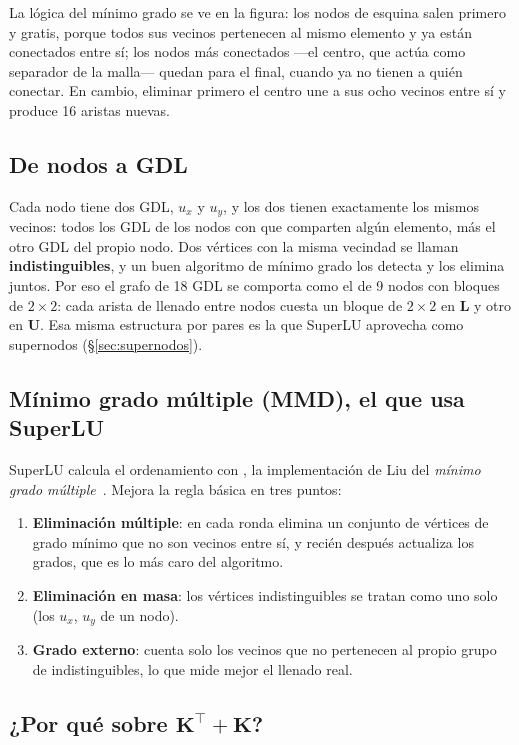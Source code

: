 \documentclass[11pt,a4paper]{article}
\newcommand{\cod}[1]{\texttt{\detokenize{#1}}}
\begin{document}
La lógica del mínimo grado se ve en la figura: los nodos de esquina salen primero y gratis, porque todos sus vecinos pertenecen al mismo elemento y ya están conectados entre sí; los nodos más conectados ---el centro, que actúa como separador de la malla--- quedan para el final, cuando ya no tienen a quién conectar. En cambio, eliminar primero el centro une a sus ocho vecinos entre sí y produce 16 aristas nuevas.

\subsection{De nodos a GDL}\label{sec:nodos-gdl}

Cada nodo tiene dos GDL, $u_x$ y $u_y$, y los dos tienen exactamente los mismos vecinos: todos los GDL de los nodos con que comparten algún elemento, más el otro GDL del propio nodo. Dos vértices con la misma vecindad se llaman \textbf{indistinguibles}, y un buen algoritmo de mínimo grado los detecta y los elimina juntos. Por eso el grafo de 18 GDL se comporta como el de 9 nodos con bloques de $2\times2$: cada arista de llenado entre nodos cuesta un bloque de $2\times2$ en $\bm{L}$ y otro en $\bm{U}$. Esa misma estructura por pares es la que SuperLU aprovecha como supernodos (§\ref{sec:supernodos}).

\subsection{Mínimo grado múltiple (MMD), el que usa SuperLU}

SuperLU calcula el ordenamiento con \cod{GENMMD}, la implementación de Liu del \emph{mínimo grado múltiple}~\cite{liu1985,george1989}. Mejora la regla básica en tres puntos:
\begin{enumerate}
  \item \textbf{Eliminación múltiple}: en cada ronda elimina un conjunto de vértices de grado mínimo que no son vecinos entre sí, y recién después actualiza los grados, que es lo más caro del algoritmo.
  \item \textbf{Eliminación en masa}: los vértices indistinguibles se tratan como uno solo (los $u_x$, $u_y$ de un nodo).
  \item \textbf{Grado externo}: cuenta solo los vecinos que no pertenecen al propio grupo de indistinguibles, lo que mide mejor el llenado real.
\end{enumerate}

\subsection{¿Por qué sobre \texorpdfstring{$\bm{K}^{\top}+\bm{K}$}{KT+K}?}\label{sec:atmasa}
\end{document}
